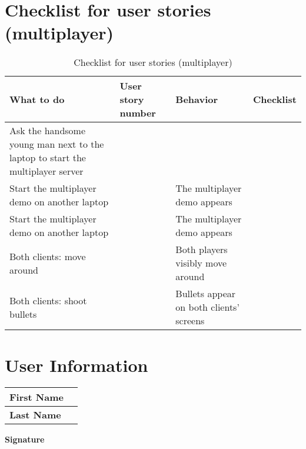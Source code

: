 \documentclass{article}
\begin{document}
\section{Checklist for user stories (multiplayer)}
\begin{table}[H]
    \centering
    \begin{tabular}{|p{3cm}|p{3cm}|p{6cm}|p{3cm}|}
    \hline
    \textbf{What to do} & \textbf{User story number} & \textbf{Behavior} & \textbf{Checklist} \\ \hline
    Ask the handsome young man next to the laptop to start the multiplayer server & & & \\ \hline
    Start the multiplayer demo on another laptop & & The multiplayer demo appears & \\ \hline
    Start the multiplayer demo on another laptop & & The multiplayer demo appears & \\ \hline
    Both clients: move around & & Both players visibly move around & \\ \hline
    Both clients: shoot bullets & & Bullets appear on both clients' screens & \\ \hline
    
    \end{tabular}
    \caption{Checklist for user stories (multiplayer)}
    \label{tab:user_stories}
    \end{table}

    \section{User Information}
    \begin{longtable}{|p{5cm}|p{10cm}|}
    \hline
    \textbf{First Name} & \\ \hline
    \textbf{Last Name} & \\ \hline
    \end{longtable}

    \textbf{Signature} \dotfill
\end{document}
